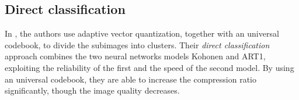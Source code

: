 \subsection{Direct classification}
In \cite{Soliman2006258}, the authors use adaptive vector quantization, together with an universal codebook, to divide the subimages into clusters. Their \emph{direct classification} approach combines the two neural networks models Kohonen and ART1, exploiting the reliability of the first and the speed of the second model. By using an universal codebook, they are able to increase the compression ratio significantly, though the image quality decreases.

